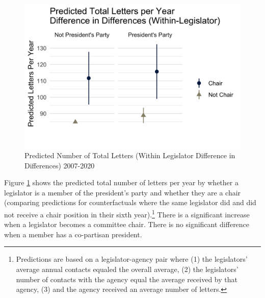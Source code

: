 \documentclass[12pt]{article}
\begin{document}



\begin{figure}[hbt!]
\centering
\caption{Predicted Number of Total Letters (Within Legislator Difference in Differences) 2007-2020} \label{f:m-total-predicted}
\includegraphics[width = .8\textwidth]{figs/m-total-predicted-3}
\end{figure}

Figure \ref{f:m-total-predicted} shows the predicted total number of letters per year by whether a legislator is a member of the president's party and whether they are a chair (comparing predictions for counterfactuals where the same legislator did and did not receive a chair position in their sixth year).\footnote{Predictions are based on a legislator-agency pair where (1) the legislators' average annual contacts equaled the overall average, (2) the legislators' number of contacts with the agency equal the average received by that agency, (3) and the agency received an average number of letters.} 
There is a significant increase when a legislator becomes a committee chair. There is no significant difference when a member has a co-partisan president.
\end{document}
